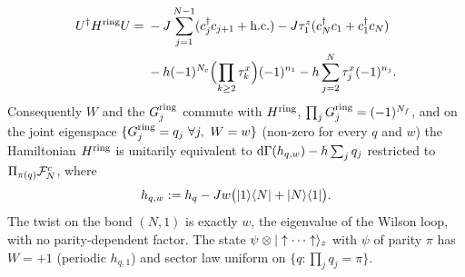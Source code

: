 \begin{proposition}
\begin{enumerate}[label=(\roman*)]
\begin{gather*}
\begin{aligned}
  U^\dagger H^{\rm ring}U={}&-J\sum_{j=1}^{N-1}(c_j^\dagger c_{j+1}+{\rm h.c.})-J\tau^{z}_{1}(c_N^\dagger c_1+c_1^\dagger c_N)\\
  &-h(-1)^{N_c}\Bigl(\prod_{k\ge2}\tau^{x}_{k}\Bigr)(-1)^{n_1}-h\sum_{j=2}^N\tau^{x}_{j}(-1)^{n_j}.
  \end{aligned}
\end{gather*}
Consequently $W$ and the $G^{\rm ring}_j$ commute with $H^{\rm ring}$, $\prod_jG_j^{\rm ring}=(-1)^{N_f}$, and on
the joint eigenspace $\{G^{\rm ring}_j=q_j\ \forall j,\ W=w\}$ (non-zero for every $q$ and $w$) the
Hamiltonian $H^{\rm ring}$ is unitarily equivalent to $\mathrm{d}\Gamma(h_{q,w})-h\sum_jq_j$ restricted to
$\Pi_{\pi(q)}\mathcal{F}^c_N$, where
\begin{equation}\label{eq:ringtwist}
  h_{q,w}:=h_{q}-Jw\bigl(|1\rangle\langle N|+|N\rangle\langle 1|\bigr).
\end{equation}
The twist on the bond $(N,1)$ is exactly $w$, the eigenvalue of the Wilson loop, with no
parity-dependent factor.  The state $\psi\otimes|\uparrow\cdots\uparrow\rangle_z$ with $\psi$ of parity
$\pi$ has $W=+1$ (periodic $h_{q,1}$) and sector law uniform on $\{q:\prod_jq_j=\pi\}$.
\end{enumerate}
\end{proposition}

